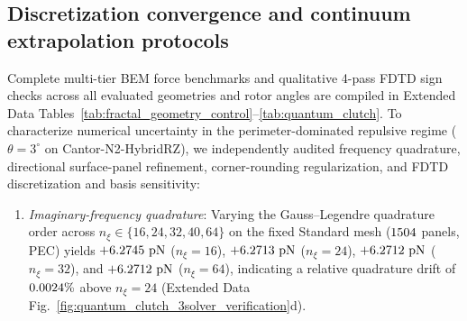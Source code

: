 \documentclass[pdflatex,sn-nature]{sn-jnl}
\DeclareRobustCommand{\roundfour}[1]{\fpeval{round(#1,4)}}
\begin{document}
\subsection*{Discretization convergence and continuum extrapolation protocols}
Complete multi-tier BEM force benchmarks and qualitative 4-pass FDTD sign checks across all evaluated geometries and rotor angles are compiled in Extended Data Tables~\ref{tab:fractal_geometry_control}--\ref{tab:quantum_clutch}. To characterize numerical uncertainty in the perimeter-dominated repulsive regime ($\theta=3^\circ$ on Cantor-N2-HybridRZ), we independently audited frequency quadrature, directional surface-panel refinement, corner-rounding regularization, and FDTD discretization and basis sensitivity:
\begin{enumerate}
    \item \emph{Imaginary-frequency quadrature}: Varying the Gauss--Legendre quadrature order across $n_\xi \in \{16, 24, 32, 40, 64\}$ on the fixed Standard mesh ($1504{}$ panels, PEC) yields $+\roundfour{\BemConvStdNxionesixPecFzPn}\text{ pN}$ ($n_\xi=16$), $+\roundfour{\BemConvStdNxitwofourPecFzPn}\text{ pN}$ ($n_\xi=24$), $+\roundfour{\BemConvStdNxithreetwoPecFzPn}\text{ pN}$ ($n_\xi=32$), and $+\roundfour{\BemConvStdNxisixfourPecFzPn}\text{ pN}$ ($n_\xi=64$), indicating a relative quadrature drift of $\roundfour{\BemConvNxiDriftPct}\%$ above $n_\xi = 24$ (Extended Data Fig.~\ref{fig:quantum_clutch_3solver_verification}d).

\end{enumerate}
\end{document}
